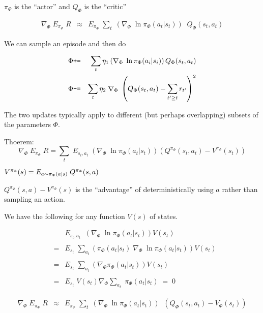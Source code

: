 {\vfill
\centerline{{\color{red} $\pi_\Phi$} is the ``actor'' and {\color{red} $Q_\Phi$} is the ``critic''}

\begin{eqnarray*}
  \nabla_\Phi \;E_{\pi_\Phi}\;R   & \approx & E_{\pi_\Phi} \; \sum_t\; \left(\nabla_\Phi \;\ln \pi_\Phi(a_t|s_t)\right) \;\;Q_\Phi(s_t,a_t)
\end{eqnarray*}

We can sample an episode and then do

\begin{eqnarray*}
  \Phi  &\mbox{\tt +=} & \sum_t \eta_1\left(\nabla_{\Phi}\;\ln \pi_{\Phi}(a_i|s_i)\right)Q_\Phi(s_t,a_t)\\
  \Phi & \mbox{\tt -=} & \sum_t \eta_2 \;\nabla_{\Phi}\;\left(Q_\Phi(s_t,a_t) - \sum_{t' \geq t} r_{t'}\right)^2
\end{eqnarray*}

The two updates typically apply to different (but perhaps overlapping) subsets of the parameters $\Phi$.


Thoerem:
$$\nabla_\Phi \;E_{\pi_\Phi}\; R = \sum_t\;E_{s_t,a_t} \; \left(\nabla_\Phi \;\ln \pi_\Phi(a_t|s_t)\right)(Q^{\pi_\Phi}(s_t,a_t) - V^{\pi_\Phi}(s_t))$$

\vfill
$V^{\pi_\Phi}(s) = E_{a \sim \pi_\Phi(a|s)}\;Q^{\pi_\Phi}(s,a)$

\vfill
$Q^{\pi_\Phi}(s,a) - V^{\pi_\Phi}(s)$ is the ``advantage'' of deterministically using $a$ rather than sampling an action.


We have the following for any function $V(s)$ of states.

\begin{eqnarray*}
 & & E_{s_t,a_t} \;  \; \left(\nabla_\Phi \;\ln \pi_\Phi(a_t|s_t)\right) V(s_t) \\
 \\
 & = & E_{s_t} \;  \sum_{a_t} \left(\pi_\Phi(a_t|s_t) \;\nabla_\Phi \;\ln \pi_\Phi(a_t|s_t)\right) V(s_t) \\
 \\
 & = & E_{s_t} \;  \sum_{a_t} \left(\nabla_\Phi \pi_\Phi(a_t|s_t)\right) V(s_t) \\
 \\
 & = & E_{s_t} \;  V(s_t) \nabla_\Phi \sum_{a_t}\; \pi_\Phi(a_t|s_t) \;=\; 0
\end{eqnarray*}

\begin{eqnarray*}
  \nabla_\Phi \;E_{\pi_\Phi}\;R   & \approx & E_{\pi_\Phi} \; \sum_t\; \left(\nabla_\Phi \;\ln \pi_\Phi(a_t|s_t)\right) \;\;(Q_\Phi(s_t,a_t) - V_\Phi(s_t))
\end{eqnarray*}

}
